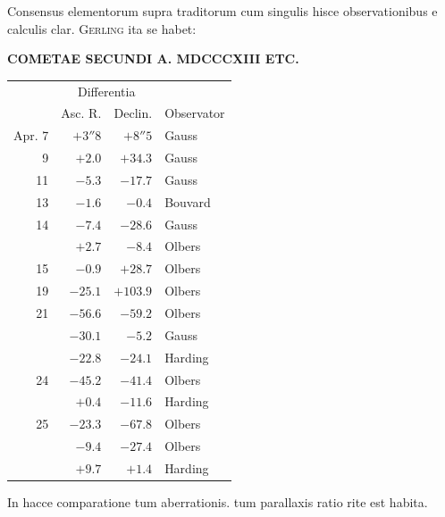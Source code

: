 Consensus elementorum supra traditorum cum singulis hisce observationibus e calculis clar. \textsc{Gerling} ita se habet:
\par\clearpage
\thispagestyle{empty}
\noindent{}%
\makebox[12mm][l]{}%
\parbox[t]{\dimexpr\linewidth-24mm\relax}{\centering\footnotesize\bfseries COMETAE SECUNDI A. MDCCCXIII ETC.\par}%
\par\nobreak\medskip
\begin{center}\small\setlength{\tabcolsep}{6pt}
\begin{tabular}{r|r|r|l}
&\multicolumn{2}{c|}{Differentia}&\\
&Asc. R.&Declin.&Observator\\\hline
Apr. 7&$+3''8$&$+8''5$&Gauss\\
9&$+2.0$&$+34.3$&Gauss\\
11&$-5.3$&$-17.7$&Gauss\\
13&$-1.6$&$-0.4$&Bouvard\\
14&$-7.4$&$-28.6$&Gauss\\
&$+2.7$&$-8.4$&Olbers\\
15&$-0.9$&$+28.7$&Olbers\\
19&$-25.1$&$+103.9$&Olbers\\
21&$-56.6$&$-59.2$&Olbers\\
&$-30.1$&$-5.2$&Gauss\\
&$-22.8$&$-24.1$&Harding\\
24&$-45.2$&$-41.4$&Olbers\\
&$+0.4$&$-11.6$&Harding\\
25&$-23.3$&$-67.8$&Olbers\\
&$-9.4$&$-27.4$&Olbers\\
&$+9.7$&$+1.4$&Harding
\end{tabular}\end{center}

In hacce comparatione tum aberrationis. tum parallaxis ratio rite est habita.
\par\nobreak\smallskip
\noindent\makebox[\linewidth][c]{\rule{.225\linewidth}{.3pt}}\par\medskip

